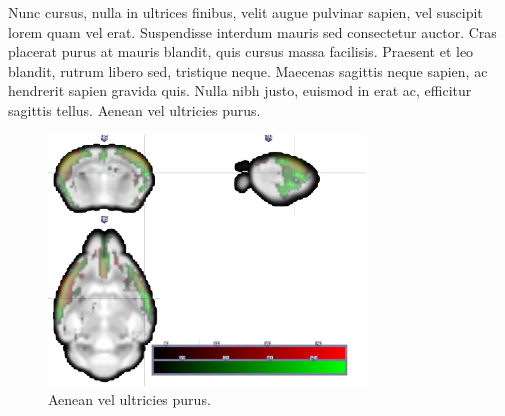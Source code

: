 Nunc cursus, nulla in ultrices finibus, velit augue pulvinar sapien, vel suscipit lorem quam vel erat. Suspendisse interdum mauris sed consectetur auctor. Cras placerat purus at mauris blandit, quis cursus massa facilisis. Praesent et leo blandit, rutrum libero sed, tristique neque. Maecenas sagittis neque sapien, ac hendrerit sapien gravida quis. Nulla nibh justo, euismod in erat ac, efficitur sagittis tellus. Aenean vel ultricies purus.
	
\begin{figure}
	\begin{minipage}{0.85\textwidth}
		\centering\includegraphics[width=0.75\textwidth]{img/fail.png}
		\caption{Aenean vel ultricies purus.}
		\label{fig:fail}
	\end{minipage}
\end{figure}